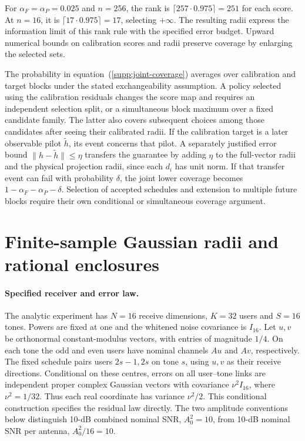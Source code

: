 \documentclass[10pt,letterpaper]{article}
\begin{document}
For $\alpha_F=\alpha_P=0.025$ and $n=256$, the rank is $\lceil257\cdot0.975\rceil=251$ for each score. At $n=16$, it is $\lceil17\cdot0.975\rceil=17$, selecting $+\infty$. The resulting radii express the information limit of this rank rule with the specified error budget. Upward numerical bounds on calibration scores and radii preserve coverage by enlarging the selected sets.

The probability in equation~(\ref{supp:joint-coverage}) averages over calibration and target blocks under the stated exchangeability assumption. A policy selected using the calibration residuals changes the score map and requires an independent selection split, or a simultaneous block maximum over a fixed candidate family. The latter also covers subsequent choices among those candidates after seeing their calibrated radii. If the calibration target is a later observable pilot $\widetilde h$, its event concerns that pilot. A separately justified error bound $\|h-\widetilde h\|\le\eta$ transfers the guarantee by adding $\eta$ to the full-vector radii and the physical projection radii, since each $d_i$ has unit norm. If that transfer event can fail with probability $\delta$, the joint lower coverage becomes $1-\alpha_F-\alpha_P-\delta$. Selection of accepted schedules and extension to multiple future blocks require their own conditional or simultaneous coverage argument.

\FloatBarrier
\section{Finite-sample Gaussian radii and rational enclosures}
\label{supp:note2}

\paragraph{Specified receiver and error law.}
The analytic experiment has \(N=16\) receive dimensions, \(K=32\) users and \(S=16\) tones. Powers are fixed at one and the whitened noise covariance is \(I_{16}\). Let \(u,v\) be orthonormal constant-modulus vectors, with entries of magnitude \(1/4\). On each tone the odd and even users have nominal channels \(Au\) and \(Av\), respectively. The fixed schedule pairs users \(2s-1,2s\) on tone \(s\), using \(u,v\) as their receive directions. Conditional on these centres, errors on all user--tone links are independent proper complex Gaussian vectors with covariance \(\nu^2I_{16}\), where \(\nu^2=1/32\). Thus each real coordinate has variance \(\nu^2/2\). This conditional construction specifies the residual law directly. The two amplitude conventions below distinguish 10-dB combined nominal SNR, \(A_0^2=10\), from 10-dB nominal SNR per antenna, \(A_0^2/16=10\).
\end{document}
